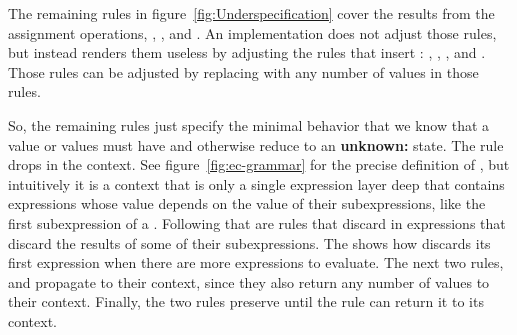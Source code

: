 The remaining rules in figure~\ref{fig:Underspecification} cover the results from the assignment operations, , , and . An implementation does not adjust those rules, but instead renders them useless by adjusting the rules that insert : , , , and . Those rules can be adjusted by replacing  with any number of values in those rules.

So, the remaining rules just specify the minimal behavior that we know that a value or values must have and otherwise reduce to an \textbf{unknown:} state. The rule  drops  in the  context. See figure~\ref{fig:ec-grammar} for the precise definition of , but intuitively it is a context that is only a single expression layer deep that contains expressions whose value depends on the value of their subexpressions, like the first subexpression of a . Following that are rules that discard  in expressions that discard the results of some of their subexpressions. The  shows how  discards its first expression when there are more expressions to evaluate. The next two rules,  and  propagate  to their context, since they also return any number of values to their context. Finally, the two  rules preserve  until the rule  can return it to its context.


